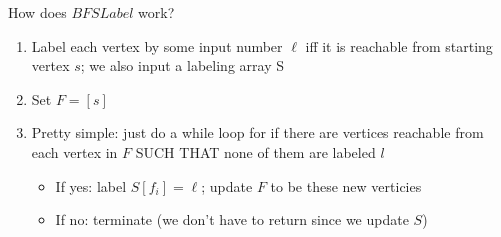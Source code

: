 \documentclass{article}
\begin{document}
How does $BFSLabel$ work?

\begin{enumerate}
  \item Label each vertex by some input number $\ell$ iff it is reachable from starting vertex $s$; we also input a labeling array S
  \item Set $F = [s]$
  \item Pretty simple: just do a while loop for if there are vertices reachable from each vertex in $F$ SUCH THAT none of them are labeled $l$
  \begin{itemize}
    \item If yes: label $S[f_{i}] = \ell$; update $F$ to be these new verticies
    \item If no: terminate (we don't have to return since we update $S$)
  \end{itemize}
\end{enumerate}
\end{document}
